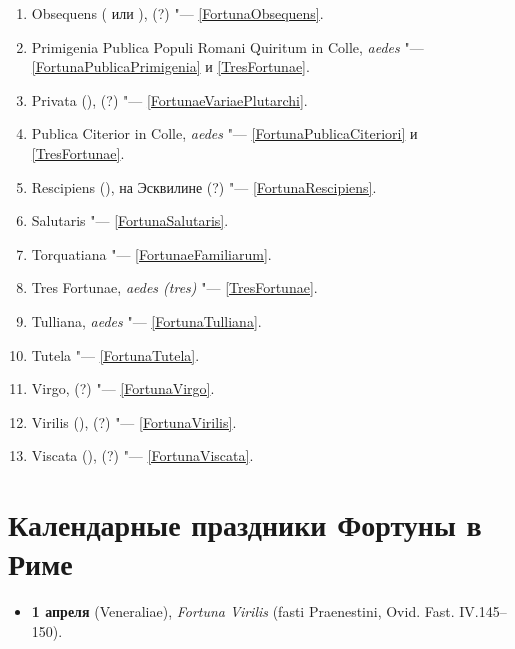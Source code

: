 \begin{appendices}
\begin{enumerate}
\item Obsequens ( или ),  (?) "--- \ref{FortunaObsequens}.

\item Primigenia Publica Populi Romani Quiritum in Colle, \textit{aedes} "--- \ref{FortunaPublicaPrimigenia} и \ref{TresFortunae}.

\item Privata (),  (?) "--- \ref{FortunaeVariaePlutarchi}.

\item Publica Citerior in Colle, \textit{aedes} "--- \ref{FortunaPublicaCiteriori} и \ref{TresFortunae}.

\item Rescipiens (),  на Эсквилине (?) "--- \ref{FortunaRescipiens}.

\item Salutaris "--- \ref{FortunaSalutaris}.

\item Torquatiana "--- \ref{FortunaeFamiliarum}.

\item Tres Fortunae, \textit{aedes (tres)} "--- \ref{TresFortunae}.

\item Tulliana, \textit{aedes} "--- \ref{FortunaTulliana}.

\item Tutela "--- \ref{FortunaTutela}.

\item Virgo,  (?) "--- \ref{FortunaVirgo}.

\item Virilis (),  (?) "--- \ref{FortunaVirilis}.

\item Viscata (),  (?) "--- \ref{FortunaViscata}.

\end{enumerate}

\section{Календарные праздники Фортуны в Риме}\label{appendix:festivales}

\begin{itemize}

\item \textbf{1 апреля} (Veneraliae), \textit{Fortuna Virilis} (fasti Praenestini, Ovid. Fast. IV.145--150).


\end{itemize}
\end{appendices}
